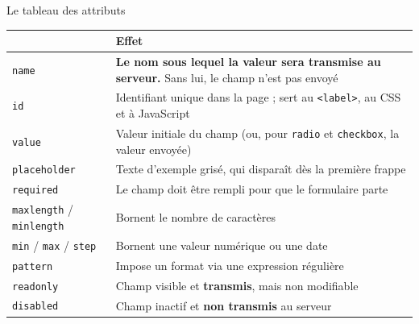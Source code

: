 \documentclass[aspectratio=169,11pt]{beamer}
\newcommand{\hdr}[1]{\multicolumn{1}{l}{\color{white}\bfseries #1}}
\begin{document}
\begin{frame}{Le tableau des attributs}
  \vspace{0.1cm}
  \begin{center}
  \scriptsize
  \begin{tabularx}{\textwidth}{lX}
    \toprule
    \rowcolor{accentBlue}
    \hdr{Attribut} & \hdr{Effet} \\
    \midrule
    \rowcolor{cfptGrey}
    \texttt{name} & \textbf{Le nom sous lequel la valeur sera transmise au serveur.} Sans lui, le champ n'est pas envoyé \\
    \texttt{id} & Identifiant unique dans la page ; sert au \texttt{<label>}, au CSS et à JavaScript \\
    \rowcolor{cfptGrey}
    \texttt{value} & Valeur initiale du champ (ou, pour \texttt{radio} et \texttt{checkbox}, la valeur envoyée) \\
    \texttt{placeholder} & Texte d'exemple grisé, qui disparaît dès la première frappe \\
    \rowcolor{cfptGrey}
    \texttt{required} & Le champ doit être rempli pour que le formulaire parte \\
    \texttt{maxlength} / \texttt{minlength} & Bornent le nombre de caractères \\
    \rowcolor{cfptGrey}
    \texttt{min} / \texttt{max} / \texttt{step} & Bornent une valeur numérique ou une date \\
    \texttt{pattern} & Impose un format via une expression régulière \\
    \rowcolor{cfptGrey}
    \texttt{readonly} & Champ visible et \textbf{transmis}, mais non modifiable \\
    \texttt{disabled} & Champ inactif et \textbf{non transmis} au serveur \\
    \bottomrule
  \end{tabularx}
  \end{center}
\end{frame}
\end{document}
